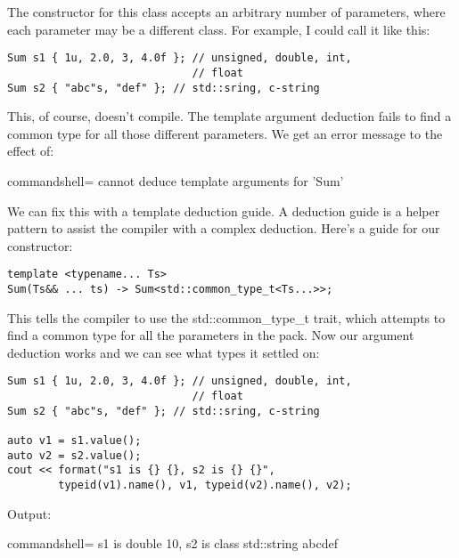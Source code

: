The constructor for this class accepts an arbitrary number of parameters, where each parameter may be a different class. For example, I could call it like this:

\begin{lstlisting}[style=styleCXX]
Sum s1 { 1u, 2.0, 3, 4.0f }; // unsigned, double, int,
							 // float
Sum s2 { "abc"s, "def" }; // std::sring, c-string
\end{lstlisting}

This, of course, doesn't compile. The template argument deduction fails to find a common type for all those different parameters. We get an error message to the effect of:

\begin{tcblisting}{commandshell={}}
cannot deduce template arguments for 'Sum'
\end{tcblisting}

We can fix this with a template deduction guide. A deduction guide is a helper pattern to assist the compiler with a complex deduction. Here's a guide for our constructor:

\begin{lstlisting}[style=styleCXX]
template <typename... Ts>
Sum(Ts&& ... ts) -> Sum<std::common_type_t<Ts...>>;
\end{lstlisting}

This tells the compiler to use the std::common\_type\_t trait, which attempts to find a common type for all the parameters in the pack. Now our argument deduction works and we can see what types it settled on:

\begin{lstlisting}[style=styleCXX]
Sum s1 { 1u, 2.0, 3, 4.0f }; // unsigned, double, int,
							 // float
Sum s2 { "abc"s, "def" }; // std::sring, c-string

auto v1 = s1.value();
auto v2 = s2.value();
cout << format("s1 is {} {}, s2 is {} {}",
		typeid(v1).name(), v1, typeid(v2).name(), v2);
\end{lstlisting}

Output:

\begin{tcblisting}{commandshell={}}
s1 is double 10, s2 is class std::string abcdef
\end{tcblisting}



